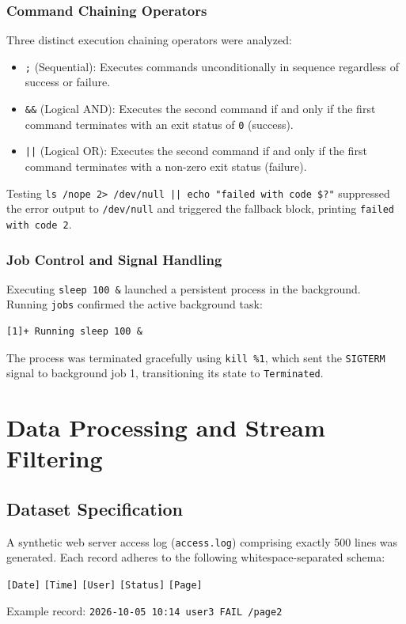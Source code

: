 \documentclass[12pt,a4paper]{article}
\begin{document}
\subsubsection{Command Chaining Operators}
Three distinct execution chaining operators were analyzed:
\begin{itemize}
    \item \texttt{;} (Sequential): Executes commands unconditionally in sequence regardless of success or failure.
    \item \texttt{\&\&} (Logical AND): Executes the second command if and only if the first command terminates with an exit status of \texttt{0} (success).
    \item \texttt{||} (Logical OR): Executes the second command if and only if the first command terminates with a non-zero exit status (failure).
\end{itemize}

Testing \texttt{ls /nope 2> /dev/null || echo "failed with code \$?"} suppressed the error output to \texttt{/dev/null} and triggered the fallback block, printing \texttt{failed with code 2}.

\subsubsection{Job Control and Signal Handling}
Executing \texttt{sleep 100 \&} launched a persistent process in the background. Running \texttt{jobs} confirmed the active background task:
\begin{lstlisting}[style=consolestyle]
[1]+ Running sleep 100 &
\end{lstlisting}
The process was terminated gracefully using \texttt{kill \%1}, which sent the \texttt{SIGTERM} signal to background job 1, transitioning its state to \texttt{Terminated}.

\section{Data Processing and Stream Filtering}

\subsection{Dataset Specification}
A synthetic web server access log (\texttt{access.log}) comprising exactly 500 lines was generated. Each record adheres to the following whitespace-separated schema:
\begin{center}
\texttt{[Date]} \quad \texttt{[Time]} \quad \texttt{[User]} \quad \texttt{[Status]} \quad \texttt{[Page]}
\end{center}
Example record: \texttt{2026-10-05 10:14 user3 FAIL /page2}
\end{document}
